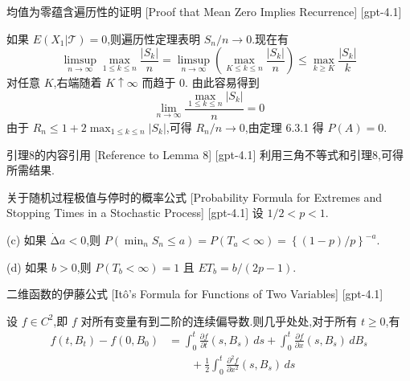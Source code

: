 \documentclass[UTF8]{ctexart}
\begin{document}
    
    
    \begin{prf}
        {均值为零蕴含遍历性的证明}
        [Proof that Mean Zero Implies Recurrence]
        [gpt-4.1]
        
如果 $E ( X _ { 1 } | \mathcal{T} ) = 0$,则遍历性定理表明 $S _ { n } / n \to 0$.现在有
\[
\limsup_{n \to \infty} \max_{1 \leq k \leq n} \frac{ | S _ { k } | }{ n } = \limsup_{n \to \infty} \left( \max_{K \leq k \leq n} \frac{ | S _ { k } | }{ n } \right) \leq \max_{k \geq K} \frac{ | S _ { k } | }{ k }
\]
对任意 $K$,右端随着 $K \uparrow \infty$ 而趋于 $0$.
由此容易得到
\[
\lim_{n \to \infty} \frac{ \max_{1 \leq k \leq n} | S _ { k } | }{ n } = 0
\]
由于 $R _ { n } \leq 1 + 2 \max_{1 \leq k \leq n} | S _ { k } |$,可得 $R _ { n } / n \to 0$,由定理 6.3.1 得 $P ( A ) = 0$.

    \end{prf}
    
    
    
    \begin{lma}
        {引理8的内容引用}
        [Reference to Lemma 8]
        [gpt-4.1]
        利用三角不等式和引理8,可得所需结果.
    \end{lma}
    
    
    
    \begin{thm}
        {关于随机过程极值与停时的概率公式}
        [Probability Formula for Extremes and Stopping Times in a Stochastic Process]
        [gpt-4.1]
        设 $1 / 2 < p < 1$.

(c) 如果 $\dot{\mathrm{\Delta}} a < 0$,则 $P(\min_n S_n \leq a) = P(T_a < \infty) = \left\{ (1 - p) / p \right\}^{-a}$.

(d) 如果 $b > 0$,则 $P(T_b < \infty) = 1$ 且 $E T_b = b / (2p - 1)$.

    \end{thm}
    
    
    
    \begin{thm}
        {二维函数的伊藤公式}
        [Itô's Formula for Functions of Two Variables]
        [gpt-4.1]
        
设 $f \in C^2$,即 $f$ 对所有变量有到二阶的连续偏导数.则几乎处处,对于所有 $t \geq 0$,有
\[
\begin{aligned}
f(t, B_t) - f(0, B_0) &= \int_0^t \frac{\partial f}{\partial t}(s, B_s)\, ds + \int_0^t \frac{\partial f}{\partial x}(s, B_s)\, dB_s \\
&\qquad + \frac{1}{2} \int_0^t \frac{\partial^2 f}{\partial x^2}(s, B_s)\, ds
\end{aligned}
\]

    \end{thm}
    
\end{document}
